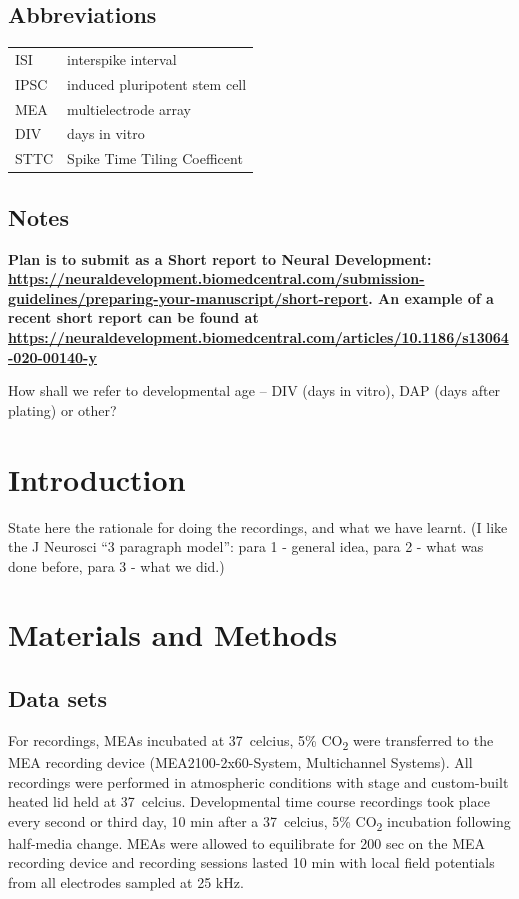 \documentclass[doublespacing]{bmcart}
\begin{document}
\begin{frontmatter}
\begin{abstractbox}
\begin{keyword}
\end{keyword}

\end{abstractbox}

\subsection*{Abbreviations}
\begin{tabular}{ll}
  ISI & interspike interval\\
  IPSC & induced pluripotent stem cell\\
  MEA & multielectrode array\\
  DIV & days in vitro\\
  STTC & Spike Time Tiling Coefficent\\
\end{tabular}

\end{frontmatter}



\subsection*{Notes}
\textbf{Plan is to submit as a Short report to Neural Development:
  \url{https://neuraldevelopment.biomedcentral.com/submission-guidelines/preparing-your-manuscript/short-report}.
  An example of a recent short report can be found at 
\url{https://neuraldevelopment.biomedcentral.com/articles/10.1186/s13064-020-00140-y}}



How shall we refer to developmental age -- DIV (days in vitro), DAP
(days after plating) or other?

\section*{Introduction}
State here the rationale for doing the recordings, and what we have
learnt.  (I like the J Neurosci ``3 paragraph model'': para 1 -
general idea, para 2 - what was done before, para 3 - what we did.)

\section*{Materials and Methods}

\subsection*{Data sets}
For recordings, MEAs incubated at \SI{37}{celcius}, 5\%
CO\textsubscript{2} were transferred to the MEA recording device
(MEA2100-2x60-System, Multichannel Systems). All recordings were
performed in atmospheric conditions with stage and custom-built heated
lid held at \SI{37}{celcius}. Developmental time course recordings took
place every second or third day, 10 min after a \SI{37}{celcius}, 5\%
CO\textsubscript{2} incubation following half-media change. MEAs were
allowed to equilibrate for 200 sec on the MEA recording device and
recording sessions lasted 10 min with local field potentials from all
electrodes sampled at 25 kHz.
\end{document}
